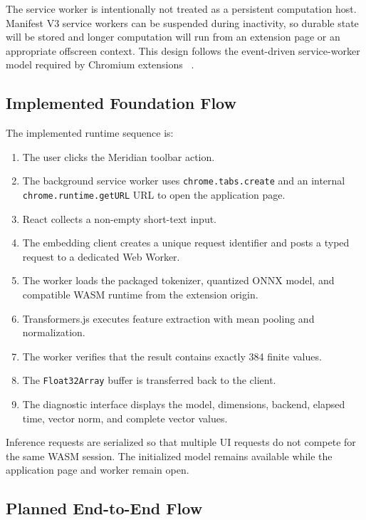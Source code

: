 \documentclass{tietreport}
\begin{document}
The service worker is intentionally not treated as a persistent computation host. Manifest
V3 service workers can be suspended during inactivity, so durable state will be stored and
longer computation will run from an extension page or an appropriate offscreen context. This
design follows the event-driven service-worker model required by Chromium extensions
~\cite{chromeserviceworker,chromeoffscreen}.

\subsection{Implemented Foundation Flow}

The implemented runtime sequence is:

\begin{enumerate}
  \item The user clicks the Meridian toolbar action.
  \item The background service worker uses \texttt{chrome.tabs.create} and an internal
    \texttt{chrome.runtime.getURL} URL to open the application page.
  \item React collects a non-empty short-text input.
  \item The embedding client creates a unique request identifier and posts a typed request to
    a dedicated Web Worker.
  \item The worker loads the packaged tokenizer, quantized ONNX model, and compatible WASM
    runtime from the extension origin.
  \item Transformers.js executes feature extraction with mean pooling and normalization.
  \item The worker verifies that the result contains exactly 384 finite values.
  \item The \texttt{Float32Array} buffer is transferred back to the client.
  \item The diagnostic interface displays the model, dimensions, backend, elapsed time,
    vector norm, and complete vector values.
\end{enumerate}

Inference requests are serialized so that multiple UI requests do not compete for the same
WASM session. The initialized model remains available while the application page and worker
remain open.

\subsection{Planned End-to-End Flow}
\end{document}

